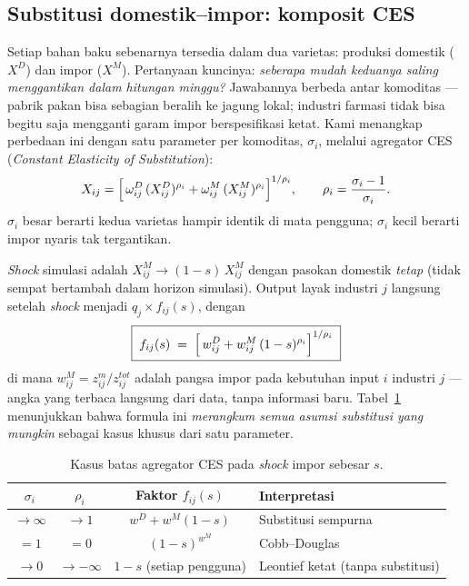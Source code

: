 \documentclass[11pt,a4paper]{article}
\newcommand{\en}[1]{\textit{#1}}   %
\begin{document}
\subsection{Substitusi domestik--impor: komposit CES}
\label{sec:ces}

Setiap bahan baku sebenarnya tersedia dalam dua varietas: produksi domestik
($X^D$) dan impor ($X^M$). Pertanyaan kuncinya: \emph{seberapa mudah
keduanya saling menggantikan dalam hitungan minggu?} Jawabannya berbeda
antar komoditas --- pabrik pakan bisa sebagian beralih ke jagung lokal;
industri farmasi tidak bisa begitu saja mengganti garam impor
berspesifikasi ketat. Kami menangkap perbedaan ini dengan satu parameter
per komoditas, $\sigma_i$, melalui agregator CES
(\en{Constant Elasticity of Substitution}):
\begin{equation}
X_{ij} = \Bigl[\, \omega^{D}_{ij} \,(X^{D}_{ij})^{\rho_i}
        + \omega^{M}_{ij}\,(X^{M}_{ij})^{\rho_i} \Bigr]^{1/\rho_i},
\qquad \rho_i = \frac{\sigma_i - 1}{\sigma_i}.
\end{equation}
$\sigma_i$ besar berarti kedua varietas hampir identik di mata pengguna;
$\sigma_i$ kecil berarti impor nyaris tak tergantikan.

\en{Shock} simulasi adalah $X^{M}_{ij} \to (1-s)\,X^{M}_{ij}$ dengan
pasokan domestik \emph{tetap} (tidak sempat bertambah dalam horizon
simulasi). Output layak industri $j$ langsung setelah \en{shock} menjadi
$q_j \times f_{ij}(s)$, dengan
\begin{equation}
\boxed{\;
f_{ij}(s) \;=\;
\Bigl[\, w^{D}_{ij} + w^{M}_{ij}\,(1-s)^{\rho_i} \Bigr]^{1/\rho_i}
\;}
\label{eq:cesfactor}
\end{equation}
di mana $w^{M}_{ij} = z^{m}_{ij} / z^{tot}_{ij}$ adalah pangsa impor pada
kebutuhan input $i$ industri $j$ --- angka yang terbaca langsung dari data,
tanpa informasi baru. Tabel~\ref{tab:ceslimits} menunjukkan bahwa formula
ini \emph{merangkum semua asumsi substitusi yang mungkin} sebagai kasus
khusus dari satu parameter.

\begin{table}[ht]
\centering\small
\caption{Kasus batas agregator CES pada \en{shock} impor sebesar $s$.}
\label{tab:ceslimits}
\begin{tabular}{@{}cccl@{}}
\toprule
$\sigma_i$ & $\rho_i$ & Faktor $f_{ij}(s)$ & Interpretasi \\
\midrule
$\to \infty$ & $\to 1$ & $w^D + w^M(1-s)$ &
  Substitusi sempurna \\
$= 1$ & $= 0$ & $(1-s)^{w^M}$ & Cobb--Douglas \\
$\to 0$ & $\to -\infty$ & $1-s$ (setiap pengguna) &
  Leontief ketat (tanpa substitusi) \\
\bottomrule
\end{tabular}
\end{table}
\end{document}
